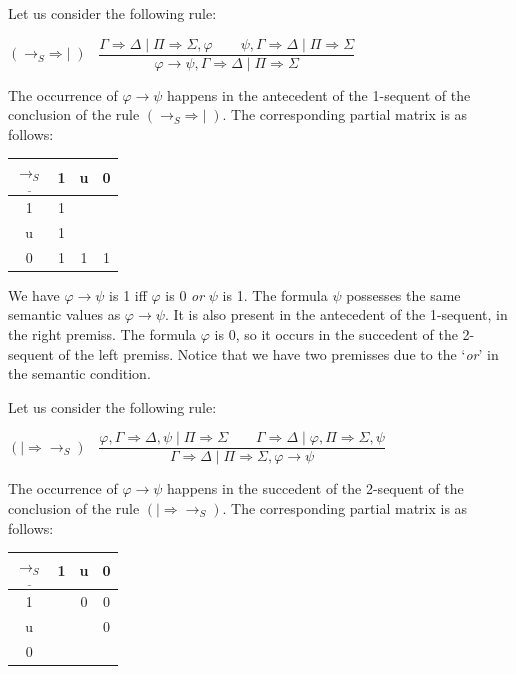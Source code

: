 \documentclass[11pt,a4paper,titlepage]{article}
\theoremstyle{definition}
\newcommand{\3}{\vspace{.3in}}
\newcommand{\2}{\vspace{.2in}}
\newcommand{\1}{\vspace{.1in}}
\newcommand{\5}{\vspace{.05in}}
\begin{document}
Let us consider the following rule:

\begin{flushleft}
	$(\mathord{\rightarrow_S}\mathord{\Rightarrow}\mid)$ \, $\dfrac{\Gamma
		\Rightarrow \Delta \mid \Pi\Rightarrow\Sigma, \varphi \qquad\psi, \Gamma\Rightarrow\Delta \mid
		\Pi \Rightarrow \Sigma } {\varphi\rightarrow\psi, \Gamma
		\Rightarrow \Delta \mid \Pi\Rightarrow\Sigma}$
\end{flushleft} 

The occurrence of $\varphi\rightarrow\psi$ happens in the antecedent of the 1-sequent of the conclusion of the rule $(\mathord{\rightarrow_S}\mathord{\Rightarrow}\mid)$.
The corresponding partial matrix is as follows:

\1

\begin{tabular}{|c|ccc|}
	\hline
	$\underline{\rightarrow_S} $ & 1 & u & 0 \\
	\hline
	1 & 1 &  &  \\
	u & 1 &  &  \\
	0 & 1 & 1 & 1 \\
	\hline
\end{tabular}

\1

We have $\varphi\rightarrow\psi$ is 1 iff $\varphi$ is 0 \textit{or} $\psi$ is 1.  The formula $ \psi $ possesses the same semantic values as $\varphi\rightarrow\psi$. It is also present in the antecedent of the 1-sequent, in the right premiss. The formula $ \varphi $ is 0, so it occurs in the succedent of the 2-sequent of the left premiss. Notice that we have two premisses due to the `\textit{or}' in the semantic condition.

Let us consider the following rule:

\begin{flushleft}
	$(\mathord{\mid\Rightarrow}\mathord{\rightarrow_S})$ \ $\dfrac{\varphi, \Gamma
		\Rightarrow \Delta, \psi \mid \Pi\Rightarrow\Sigma \qquad \Gamma\Rightarrow\Delta \mid \varphi, \Pi\Rightarrow\Sigma, \psi}{\Gamma\Rightarrow\Delta \mid \Pi\Rightarrow\Sigma, \varphi\rightarrow\psi}$
\end{flushleft}  

The occurrence of $\varphi\rightarrow\psi$ happens in the succedent of the 2-sequent of the conclusion of the rule $(\mathord{\mid\Rightarrow}\mathord{\rightarrow_S})$.
The corresponding partial matrix is as follows:

\1

\begin{tabular}{|c|ccc|}
	\hline
	$\underline{\rightarrow_S} $ & 1 & u & 0 \\
	\hline
	1 &  & 0 & 0 \\
	u &  &  & 0 \\
	0 &  &  &  \\
	\hline
\end{tabular} 
\end{document}
